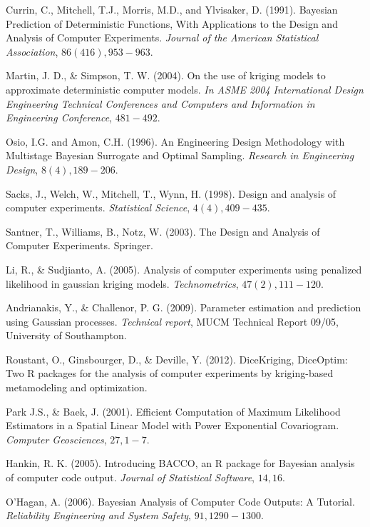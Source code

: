 \documentclass[12pt,titlepage]{report}
\theoremstyle{definition}
\theoremstyle{remark}
\begin{document}
\begin{thebibliography}{94}


 Currin, C., Mitchell, T.J., Morris, M.D., and Ylvisaker, D. (1991). Bayesian Prediction of Deterministic Functions, With Applications to the Design and Analysis of Computer Experiments. {\it Journal of the American Statistical Association}, $86(416), 953-963$. 

 Martin, J. D., \& Simpson, T. W. (2004). On the use of kriging models to approximate deterministic computer models. {\it In ASME 2004 International Design Engineering Technical Conferences and Computers and Information in Engineering Conference}, $481-492$.

 Osio, I.G. and Amon, C.H. (1996). An Engineering Design Methodology with Multistage Bayesian Surrogate and Optimal Sampling. {\it Research in Engineering Design}, $8(4), 189-206$.

 Sacks, J., Welch, W., Mitchell, T., Wynn, H. (1998). Design and analysis of computer experiments. {\it Statistical Science}, $4(4), 409-435$.

 Santner, T., Williams, B., Notz, W. (2003). The Design and Analysis of Computer Experiments. Springer.

 Li, R., \& Sudjianto, A. (2005). Analysis of computer experiments using penalized likelihood in gaussian kriging models. {\it Technometrics}, $47(2), 111-120$.

 Andrianakis, Y., \& Challenor, P. G. (2009). Parameter estimation and prediction using Gaussian processes. {\it Technical report}, MUCM Technical Report 09/05, University of Southampton.

 Roustant, O., Ginsbourger, D., \& Deville, Y. (2012). DiceKriging, DiceOptim: Two R packages for the analysis of computer experiments by kriging-based metamodeling and optimization.

 Park J.S., \& Baek, J. (2001). Efficient Computation of Maximum Likelihood Estimators in a
Spatial Linear Model with Power Exponential Covariogram. {\it Computer Geosciences}, $27, 1-7$.

 Hankin, R. K. (2005). Introducing BACCO, an R package for Bayesian analysis of computer code output. {\it Journal of Statistical Software}, $14, 16$.

 O'Hagan, A. (2006). Bayesian Analysis of Computer Code Outputs: A Tutorial. {\it Reliability Engineering and System Safety}, $91, 1290-1300$.

\end{thebibliography}{}
\end{document}
